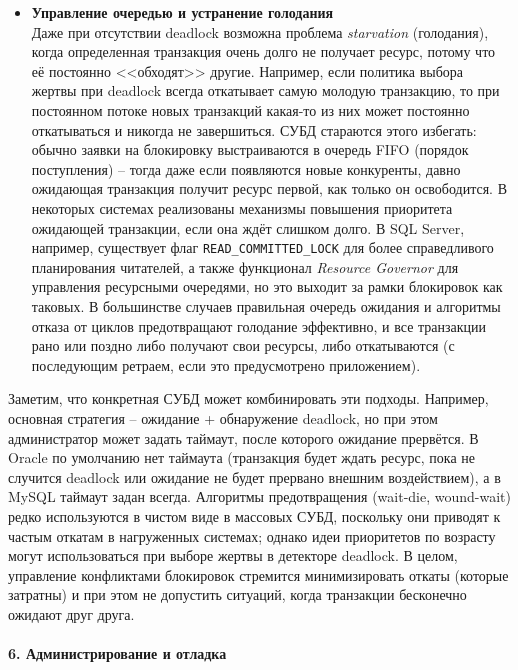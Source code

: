 \begin{itemize}
    \item \textbf{Управление очередью и устранение голодания} ~\\
   Даже при отсутствии deadlock возможна проблема \textit{starvation} (голодания), когда определенная транзакция очень долго не получает ресурс, потому что её постоянно <<обходят>> другие. Например, если политика выбора жертвы при deadlock всегда откатывает самую молодую транзакцию, то при постоянном потоке новых транзакций какая-то из них может постоянно откатываться и никогда не завершиться. СУБД стараются этого избегать: обычно заявки на блокировку выстраиваются в очередь FIFO (порядок поступления) – тогда даже если появляются новые конкуренты, давно ожидающая транзакция получит ресурс первой, как только он освободится. В некоторых системах реализованы механизмы повышения приоритета ожидающей транзакции, если она ждёт слишком долго. В SQL Server, например, существует флаг \texttt{READ\_COMMITTED\_LOCK} для более справедливого планирования читателей, а также функционал \textit{Resource Governor} для управления ресурсными очередями, но это выходит за рамки блокировок как таковых. В большинстве случаев правильная очередь ожидания и алгоритмы отказа от циклов предотвращают голодание эффективно, и все транзакции рано или поздно либо получают свои ресурсы, либо откатываются (с последующим ретраем, если это предусмотрено приложением).
 \end{itemize} 
Заметим, что конкретная СУБД может комбинировать эти подходы. Например, основная стратегия – ожидание + обнаружение deadlock, но при этом администратор может задать таймаут, после которого ожидание прервётся. В Oracle по умолчанию нет таймаута (транзакция будет ждать ресурс, пока не случится deadlock или ожидание не будет прервано внешним воздействием), а в MySQL таймаут задан всегда. Алгоритмы предотвращения (wait-die, wound-wait) редко используются в чистом виде в массовых СУБД, поскольку они приводят к частым откатам в нагруженных системах; однако идеи приоритетов по возрасту могут использоваться при выборе жертвы в детекторе deadlock. В целом, управление конфликтами блокировок стремится минимизировать откаты (которые затратны) и при этом не допустить ситуаций, когда транзакции бесконечно ожидают друг друга.

\paragraph{6. Администрирование и отладка} ~\\

